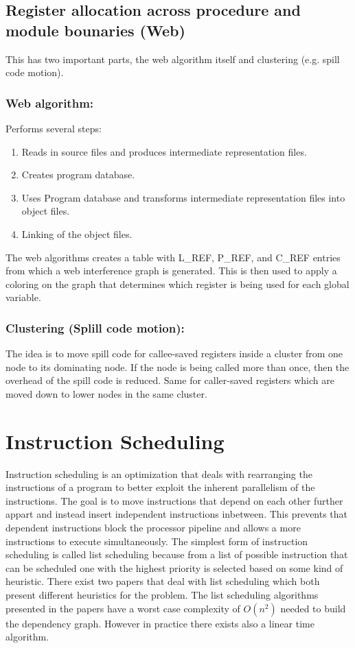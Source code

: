 \documentclass[a4paper,10pt]{article}
\begin{document}
\subsection{Register allocation across procedure and module bounaries (Web)}
This has two important parts, the web algorithm itself and clustering (e.g. spill code motion).
\subsubsection*{Web algorithm:}
Performs several steps:
\begin{enumerate}
 \item Reads in source files and produces intermediate representation files.
 \item Creates program database.
 \item Uses Program database and transforms intermediate representation files into object files.
 \item Linking of the object files.
\end{enumerate}
The web algorithms creates a table with L\_REF, P\_REF, and C\_REF entries from which a web interference graph is generated. This is then
used to apply a coloring on the graph that determines which register is being used for each global variable.

\subsubsection*{Clustering (Splill code motion):}
The idea is to move spill code for callee-saved registers inside a cluster from one node to
its dominating node. If the node is being called more than once, then the overhead of the spill code is reduced. Same for caller-saved 
registers which are moved down to lower nodes in the same cluster.

\section{Instruction Scheduling}
Instruction scheduling is an optimization that deals with rearranging the instructions of a program to better exploit the inherent
parallelism of the instructions. The goal is to move instructions that depend on each other further appart and instead insert independent
instructions inbetween. This prevents that dependent instructions block the processor pipeline and allows a more instructions to execute 
simultaneously. The simplest form of instruction scheduling is called list scheduling because from a list of possible instruction that 
can be scheduled one with the highest priority is selected based on some kind of heuristic. There exist two papers that deal with list
scheduling which both present different heuristics for the problem. The list scheduling algorithms presented in the papers have a worst 
case complexity of $O(n^2)$ needed to build the dependency graph. However in practice there exists also a linear time algorithm.
\end{document}
